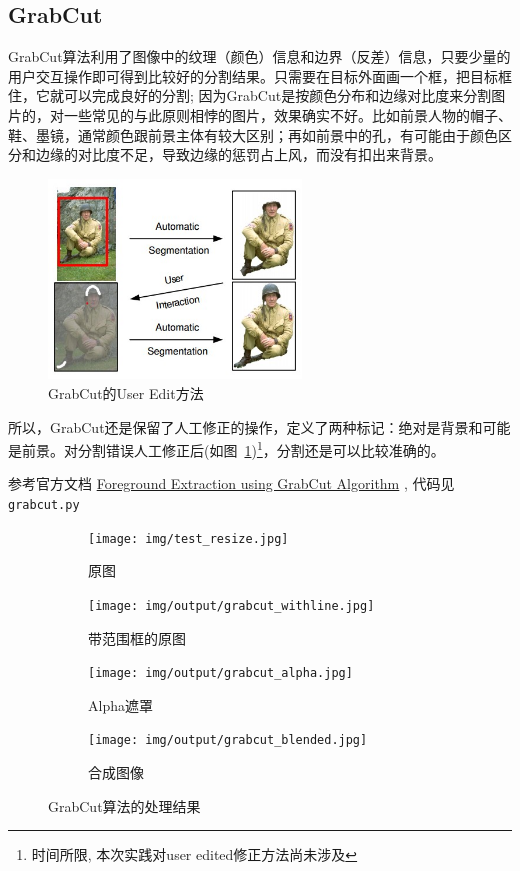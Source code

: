 \documentclass[scheme=chinese,a4paper]{article}
\begin{document}
\subsection{GrabCut}
GrabCut算法\cite{rother2004grabcut}利用了图像中的纹理（颜色）信息和边界（反差）信息，只要少量的用户交互操作即可得到比较好的分割结果。只需要在目标外面画一个框，把目标框住，它就可以完成良好的分割; 因为GrabCut是按颜色分布和边缘对比度来分割图片的，对一些常见的与此原则相悖的图片，效果确实不好。比如前景人物的帽子、鞋、墨镜，通常颜色跟前景主体有较大区别；再如前景中的孔，有可能由于颜色区分和边缘的对比度不足，导致边缘的惩罚占上风，而没有扣出来背景。
\begin{figure}[H]
\centering
\includegraphics[width=0.6\textwidth]{grabcut.jpg}
\caption{GrabCut的User Edit方法}
\label{fig:grabcut_edit}
\end{figure}
所以，GrabCut还是保留了人工修正的操作，定义了两种标记：绝对是背景和可能是前景。对分割错误人工修正后(如图~\ref{fig:grabcut_edit})\footnote{时间所限, 本次实践对user edited修正方法尚未涉及}，分割还是可以比较准确的。 

参考官方文档 \href{https://docs.opencv.org/master/dd/dfc/tutorial_js_grabcut.html}{Foreground Extraction using GrabCut Algorithm}
, 代码见\lstinline{grabcut.py}

\begin{figure}[H]
  \centering
  \begin{subfigure}{0.23\textwidth}
    \centering
    \texttt{[image: img/test\_resize.jpg]}
    \caption{原图}
  \end{subfigure}
  \begin{subfigure}{0.23\textwidth}
    \centering
    \texttt{[image: img/output/grabcut\_withline.jpg]}
    \caption{带范围框的原图}
  \end{subfigure}
  \begin{subfigure}{0.23\textwidth}
    \centering
    \texttt{[image: img/output/grabcut\_alpha.jpg]}
    \caption{Alpha遮罩}
  \end{subfigure}
  \begin{subfigure}{0.23\textwidth}
    \centering
    \texttt{[image: img/output/grabcut\_blended.jpg]}
    \caption{合成图像}
  \end{subfigure}

  \caption{GrabCut算法的处理结果}
  \end{figure}
\end{document}
